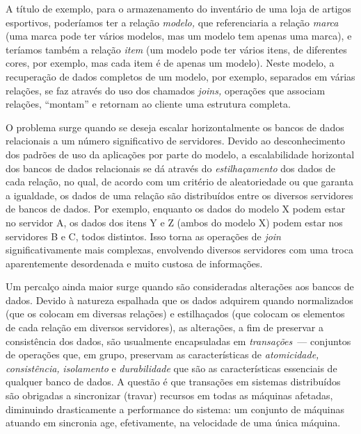 \documentclass[ruledheader, 12pt]{abnt}
\begin{document}
A título de exemplo, para o armazenamento do inventário de uma loja de artigos esportivos, poderíamos ter a relação \emph{modelo,} que referenciaria a relação \emph{marca} (uma marca pode ter vários modelos, mas um modelo tem apenas uma marca), e teríamos também a relação \emph{item} (um modelo pode ter vários itens, de diferentes cores, por exemplo, mas cada item é de apenas um modelo). Neste modelo, a recuperação de dados completos de um modelo, por exemplo, separados em várias relações, se faz através do uso dos chamados \emph{joins,} operações que associam relações, ``montam'' e retornam ao cliente uma estrutura completa.

O problema surge quando se deseja escalar horizontalmente os bancos de dados relacionais a um número significativo de servidores. Devido ao desconhecimento dos padrões de uso da aplicações por parte do modelo, a escalabilidade horizontal dos bancos de dados relacionais se dá através do \emph{estilhaçamento} dos dados de cada relação, no qual, de acordo com um critério de aleatoriedade ou que garanta a igualdade, os dados de uma relação são distribuídos entre os diversos servidores de bancos de dados. Por exemplo, enquanto os dados do modelo X podem estar no servidor A, os dados dos itens Y e Z (ambos do modelo X) podem estar nos servidores B e C, todos distintos. Isso torna as operações de \emph{join} significativamente mais complexas, envolvendo diversos servidores com uma troca aparentemente desordenada e muito custosa de informações.

Um percalço ainda maior surge quando são consideradas alterações aos bancos de dados. Devido à natureza espalhada que os dados adquirem quando normalizados (que os colocam em diversas relações) e estilhaçados (que colocam os elementos de cada relação em diversos servidores), as alterações, a fim de preservar a consistência dos dados, são usualmente encapsuladas em \emph{transações}~--- conjuntos de operações que, em grupo, preservam as características de \emph{atomicidade,} \emph{consistência,} \emph{isolamento} e \emph{durabilidade} que são as características essenciais de qualquer banco de dados. A questão é que transações em sistemas distribuídos são obrigadas a sincronizar (travar) recursos em todas as máquinas afetadas, diminuindo drasticamente a performance do sistema: um conjunto de máquinas atuando em sincronia age, efetivamente, na velocidade de uma única máquina.
\end{document}
